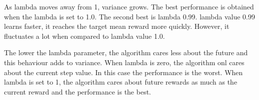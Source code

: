 \documentclass[11pt]{article}
\begin{document}
    As lambda moves away from 1, variance grows.
    The best performance is obtained when the lambda is set to 1.0.
    The second best is lambda 0.99.
    lambda value 0.99 learns faster, it reaches the target mean reward more quickly.
    However, it fluctuates a lot when compared to lambda value 1.0.

    The lower the lambda parameter, the algorithm cares less about the future and this behaviour adds to variance.
    When lambda is zero, the algorithm onl cares about the current step value.
    In this case the performance is the worst.
    When lambda is set to 1, the algorithm cares about future rewards as much as the current reward and the performance is the best.
\end{document}
